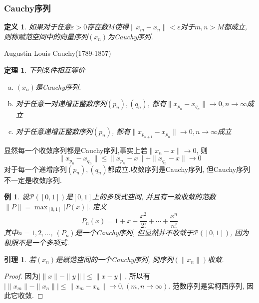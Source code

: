 \documentclass[a4paper,11pt]{article}
\newtheorem{definition}{\hspace{2em}定义}[section]
\newtheorem{theorem}{\hspace{2em}定理}[section]
\newtheorem{lemma}{\hspace{2em}引理}[section]
\newtheorem{proof}{证明}[section]
\newtheorem{example}{例}[section]
\begin{document}
\subsubsection*{Cauchy序列}
\begin{definition}
  如果对于任意$\varepsilon>0$存在数$M$使得$\|x_m-x_n\|<\varepsilon$对于$m,n>M$都成立, 则称赋范空间中的向量序列$(x_n)$为Cauchy序列.
\end{definition}
Augustin Louis Cauchy(1789-1857)
\begin{theorem}
  下列条件相互等价
  \begin{enumerate}[(a)]
    \item $(x_n)$是Cauchy序列.
    \item 对于任意一对递增正整数序列$(p_n),(q_n)$, 都有$\|x_{p_n}-x_{q_n}\|\to0,n\to\infty$成立
    \item 对于任意递增正整数序列$(p_n)$, 都有$\|x_{p_{n+1}}-x_{p_n}\|\to0,n\to\infty$成立
  \end{enumerate}
\end{theorem}
显然每一个收敛序列都是Cauchy序列,事实上若$\|x_n-x\|\to0$, 则
\begin{equation*}
  \|x_{p_n}-x_{q_n}\|\leq\|x_{p_n}-x\|+\|x_{q_n}-x\|\to0
\end{equation*}
对于每一个递增序列$(p_n),(q_n)$都成立.收敛序列是Cauchy序列, 但Cauchy序列不一定是收敛序列.
\begin{example}
  设$\mathcal{P}([0,1])$是$[0,1]$上的多项式空间, 并且有一致收敛的范数$\|P\|=\max_{[0,1]}|P(x)|$. 定义
  \begin{equation*}
    P_n(x)=1+x+\frac{x^2}{2!}+\cdots+\frac{x^n}{n!}
  \end{equation*}
  其中$n=1,2,\dots$, $(P_n)$是一个Cauchy序列, 但显然并不收敛于$\mathcal{P}([0,1])$, 因为极限不是一个多项式.
\end{example}
\begin{lemma}
  若$(x_n)$是赋范空间的一个Cauchy序列, 则序列$(\|x_n\|)$收敛.
\end{lemma}
\begin{proof}
  因为$|\|x\|-\|y\||\leq\|x-y\|$, 所以有$|\|x_m\|-\|x_n\||\leq\|x_m-x_n\|\to0,(m,n\to \infty)$. 范数序列是实柯西序列, 因此它收敛.
\end{proof}
\end{document}
